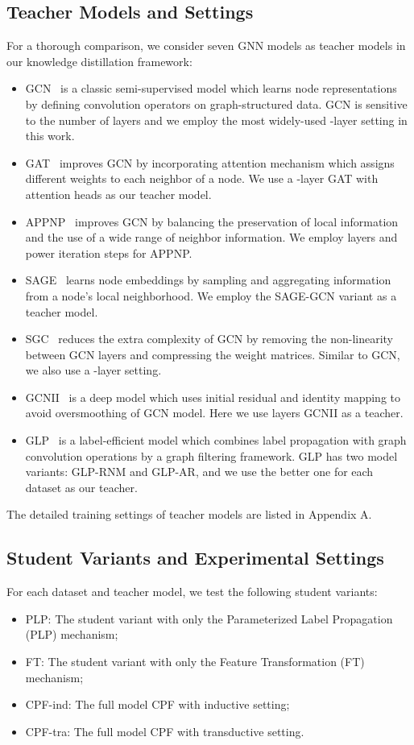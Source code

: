 \documentclass[sigconf]{acmart}
\begin{document}
\subsection{Teacher Models and Settings}
For a thorough comparison, we consider seven GNN models as teacher models in our knowledge distillation framework:
\begin{itemize}
    \item GCN~\cite{kipf2016semi} is a classic semi-supervised model which learns node representations by defining convolution operators on graph-structured data. GCN is sensitive to the number of layers and we employ the most widely-used -layer setting in this work.
    \item GAT~\cite{velivckovic2018graph} improves GCN by incorporating attention mechanism which assigns different weights to each neighbor of a node. We use a -layer GAT with  attention heads as our teacher model.
    \item APPNP~\cite{klicpera2018predict} improves GCN by balancing the preservation of local information and the use of a wide range of neighbor information. We employ  layers and  power iteration steps for APPNP.
    \item SAGE~\cite{hamilton2017inductive} learns node embeddings by sampling and aggregating information from a node’s local neighborhood. We employ the SAGE-GCN variant as a teacher model.
    \item SGC~\cite{wu2019simplifying} reduces the extra complexity of GCN by removing the non-linearity between GCN layers and compressing the weight matrices. Similar to GCN, we also use a -layer setting.
    \item GCNII~\cite{chen2020simple} is a deep model which uses initial residual and identity mapping to avoid oversmoothing of GCN model. Here we use  layers GCNII as a teacher.
    \item GLP~\cite{li2019label} is a label-efficient model which combines label propagation with graph convolution operations by a graph filtering framework. GLP has two model variants: GLP-RNM and GLP-AR, and we use the better one for each dataset as our teacher. 
\end{itemize}

The detailed training settings of teacher models are listed in Appendix A.


\subsection{Student Variants and Experimental Settings}
For each dataset and teacher model, we test the following student variants:
\begin{itemize}
    \item PLP: The student variant with only the Parameterized Label Propagation (PLP) mechanism;\item FT: The student variant with only the Feature Transformation (FT) mechanism;
    \item CPF-ind: The full model CPF with inductive setting;
    \item CPF-tra: The full model CPF with transductive setting.
\end{itemize}
\end{document}
